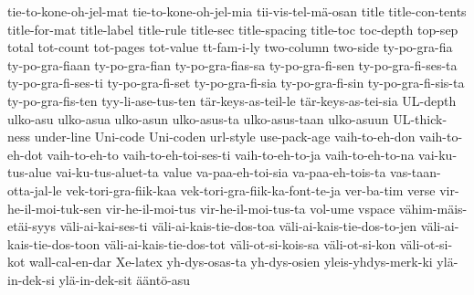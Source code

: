 {  tie-to-kone-oh-jel-mat
  tie-to-kone-oh-jel-mia
  tii-vis-tel-mä-osan
  title
  title-con-tents
  title-for-mat
  title-label
  title-rule
  title-sec
  title-spacing
  title-toc
  toc-depth
  top-sep
  total
  tot-count
  tot-pages
  tot-value
  tt-fam-i-ly
  two-column
  two-side
  ty-po-gra-fia
  ty-po-gra-fiaan
  ty-po-gra-fian
  ty-po-gra-fias-sa
  ty-po-gra-fi-sen
  ty-po-gra-fi-ses-ta
  ty-po-gra-fi-ses-ti
  ty-po-gra-fi-set
  ty-po-gra-fi-sia
  ty-po-gra-fi-sin
  ty-po-gra-fi-sis-ta
  ty-po-gra-fis-ten
  tyy-li-ase-tus-ten
  tär-keys-as-teil-le
  tär-keys-as-tei-sia
  UL-depth
  ulko-asu
  ulko-asua
  ulko-asun
  ulko-asus-ta
  ulko-asus-taan
  ulko-asuun
  UL-thick-ness
  under-line
  Uni-code
  Uni-coden
  url-style
  use-pack-age
  vaih-to-eh-don
  vaih-to-eh-dot
  vaih-to-eh-to
  vaih-to-eh-toi-ses-ti
  vaih-to-eh-to-ja
  vaih-to-eh-to-na
  vai-ku-tus-alue
  vai-ku-tus-aluet-ta
  value
  va-paa-eh-toi-sia
  va-paa-eh-tois-ta
  vas-taan-otta-jal-le
  vek-tori-gra-fiik-kaa
  vek-tori-gra-fiik-ka-font-te-ja
  ver-ba-tim
  verse
  vir-he-il-moi-tuk-sen
  vir-he-il-moi-tus
  vir-he-il-moi-tus-ta
  vol-ume
  vspace
  vähim-mäis-etäi-syys
  väli-ai-kai-ses-ti
  väli-ai-kais-tie-dos-toa
  väli-ai-kais-tie-dos-to-jen
  väli-ai-kais-tie-dos-toon
  väli-ai-kais-tie-dos-tot
  väli-ot-si-kois-sa
  väli-ot-si-kon
  väli-ot-si-kot
  wall-cal-en-dar
  Xe-latex
  yh-dys-osas-ta
  yh-dys-osien
  yleis-yhdys-merk-ki
  ylä-in-dek-si
  ylä-in-dek-sit
  ääntö-asu
}
